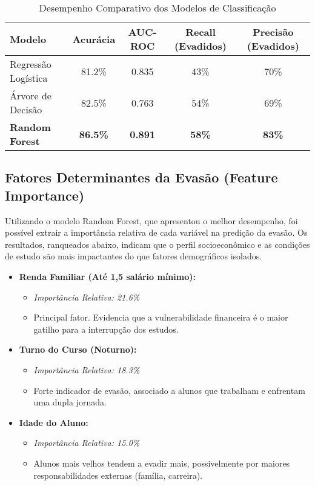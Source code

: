 \documentclass[brazilian, english, spanish]{RBIEarticle}
\begin{document}
\begin{table}[h!]
\centering
\caption{Desempenho Comparativo dos Modelos de Classificação}
\label{tab:desempenho}
\begin{tabular}{lcccc}
\toprule
\textbf{Modelo} & \textbf{Acurácia} & \textbf{AUC-ROC} & \textbf{Recall (Evadidos)} & \textbf{Precisão (Evadidos)} \\
\midrule
Regressão Logística & 81.2\% & 0.835 & 43\% & 70\% \\
Árvore de Decisão & 82.5\% & 0.763 & 54\% & 69\% \\
\rowcolor{gray}
\textbf{Random Forest} & \textbf{86.5\%} & \textbf{0.891} & \textbf{58\%} & \textbf{83\%} \\
\bottomrule
\end{tabular}
\end{table}

\subsection{Fatores Determinantes da Evasão (Feature Importance)}
Utilizando o modelo Random Forest, que apresentou o melhor desempenho, foi possível extrair a importância relativa de cada variável na predição da evasão. Os resultados, ranqueados abaixo, indicam que o perfil socioeconômico e as condições de estudo são mais impactantes do que fatores demográficos isolados.

\begin{itemize}
    \item \textbf{Renda Familiar (Até 1,5 salário mínimo):}
    \begin{itemize}
        \item \textit{Importância Relativa: 21.6\%}
        \item Principal fator. Evidencia que a vulnerabilidade financeira é o maior gatilho para a interrupção dos estudos.
    \end{itemize}

    \item \textbf{Turno do Curso (Noturno):}
    \begin{itemize}
        \item \textit{Importância Relativa: 18.3\%}
        \item Forte indicador de evasão, associado a alunos que trabalham e enfrentam uma dupla jornada.
    \end{itemize}

    \item \textbf{Idade do Aluno:}
    \begin{itemize}
        \item \textit{Importância Relativa: 15.0\%}
        \item Alunos mais velhos tendem a evadir mais, possivelmente por maiores responsabilidades externas (família, carreira).
    \end{itemize}
\end{itemize}
\end{document}
